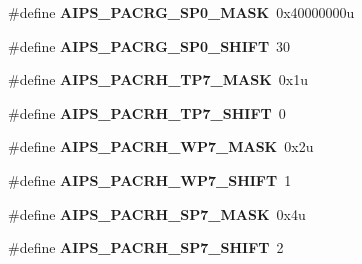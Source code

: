 \begin{DoxyCompactItemize}
\item 
\hypertarget{group___a_i_p_s___register___masks_gacaac7fd168acd47222b0c9e9a3986323}{}\#define {\bfseries A\+I\+P\+S\+\_\+\+P\+A\+C\+R\+G\+\_\+\+S\+P0\+\_\+\+M\+A\+S\+K}~0x40000000u\label{group___a_i_p_s___register___masks_gacaac7fd168acd47222b0c9e9a3986323}

\item 
\hypertarget{group___a_i_p_s___register___masks_ga22fdf34af3638622ac5f4f1079f76e0b}{}\#define {\bfseries A\+I\+P\+S\+\_\+\+P\+A\+C\+R\+G\+\_\+\+S\+P0\+\_\+\+S\+H\+I\+F\+T}~30\label{group___a_i_p_s___register___masks_ga22fdf34af3638622ac5f4f1079f76e0b}

\item 
\hypertarget{group___a_i_p_s___register___masks_gab6e73c7e30191e0fad1f05b098beea8d}{}\#define {\bfseries A\+I\+P\+S\+\_\+\+P\+A\+C\+R\+H\+\_\+\+T\+P7\+\_\+\+M\+A\+S\+K}~0x1u\label{group___a_i_p_s___register___masks_gab6e73c7e30191e0fad1f05b098beea8d}

\item 
\hypertarget{group___a_i_p_s___register___masks_ga9324cebe55b33bee69d86a86cd9d4767}{}\#define {\bfseries A\+I\+P\+S\+\_\+\+P\+A\+C\+R\+H\+\_\+\+T\+P7\+\_\+\+S\+H\+I\+F\+T}~0\label{group___a_i_p_s___register___masks_ga9324cebe55b33bee69d86a86cd9d4767}

\item 
\hypertarget{group___a_i_p_s___register___masks_ga85499f7844098271ae35ce9c75e0e216}{}\#define {\bfseries A\+I\+P\+S\+\_\+\+P\+A\+C\+R\+H\+\_\+\+W\+P7\+\_\+\+M\+A\+S\+K}~0x2u\label{group___a_i_p_s___register___masks_ga85499f7844098271ae35ce9c75e0e216}

\item 
\hypertarget{group___a_i_p_s___register___masks_gaf030ab1c75b1ebc95bfe6fca9212a176}{}\#define {\bfseries A\+I\+P\+S\+\_\+\+P\+A\+C\+R\+H\+\_\+\+W\+P7\+\_\+\+S\+H\+I\+F\+T}~1\label{group___a_i_p_s___register___masks_gaf030ab1c75b1ebc95bfe6fca9212a176}

\item 
\hypertarget{group___a_i_p_s___register___masks_ga6335ff0eb2328451109ca1069f7aab74}{}\#define {\bfseries A\+I\+P\+S\+\_\+\+P\+A\+C\+R\+H\+\_\+\+S\+P7\+\_\+\+M\+A\+S\+K}~0x4u\label{group___a_i_p_s___register___masks_ga6335ff0eb2328451109ca1069f7aab74}

\item 
\hypertarget{group___a_i_p_s___register___masks_ga5054a16e4521f511422a4206ae884c11}{}\#define {\bfseries A\+I\+P\+S\+\_\+\+P\+A\+C\+R\+H\+\_\+\+S\+P7\+\_\+\+S\+H\+I\+F\+T}~2\label{group___a_i_p_s___register___masks_ga5054a16e4521f511422a4206ae884c11}


\end{DoxyCompactItemize}
